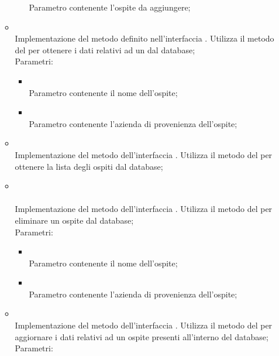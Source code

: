 \begin{itemize}
\begin{itemize}
\begin{itemize}
			Parametro contenente l'ospite da aggiungere;
		\end{itemize}
		\item[]  \\		Implementazione del metodo definito nell'interfaccia . Utilizza il metodo  del  per ottenere i dati relativi ad un  dal database;\\
		Parametri:
		\begin{itemize}
			\item {} \\
			Parametro contenente il nome dell'ospite;
			\item {} \\
			Parametro contenente l'azienda di provenienza dell'ospite;
		\end{itemize}
		\item[]  \\		Implementazione del metodo dell'interfaccia . Utilizza il metodo  del  per ottenere la lista degli ospiti dal database;\\
		\item[]  \\\\		Implementazione del metodo dell'interfaccia . Utilizza il metodo  del  per eliminare un ospite dal database;\\
		Parametri:
		\begin{itemize}
			\item {} \\
			Parametro contenente il nome dell'ospite;
			\item {} \\
			Parametro contenente l'azienda di provenienza dell'ospite;
		\end{itemize}
		\item[]  \\		Implementazione del metodo dell'interfaccia . Utilizza il metodo  del  per aggiornare i dati relativi ad un ospite presenti all'interno del database;\\
		Parametri:
		\begin{itemize}

\end{itemize}
\end{itemize}
\end{itemize}
